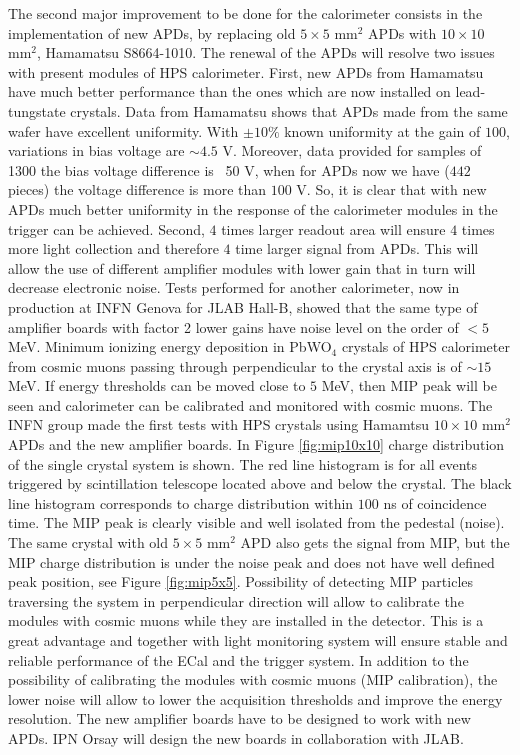 The second major improvement to be done for the calorimeter consists in the implementation of new APDs, by replacing old $5\times 5$ mm$^2$ APDs with $10\times 10$ mm$^2$, Hamamatsu S8664-1010. The renewal of the APDs will resolve two issues with present modules of HPS calorimeter. First, new APDs from Hamamatsu have much better performance than the ones which are now installed on lead-tungstate crystals. Data from Hamamatsu shows that APDs made from the same wafer have excellent uniformity. With $\pm 10\%$ known uniformity at the gain of $100$, variations in bias voltage are $\sim 4.5$ V. Moreover, data provided for samples of 1300 the bias voltage difference is ~50 V, when for APDs now we have ($442$ pieces) the voltage difference is more than $100$ V. So, it is clear that with new APDs much better uniformity in the response of the calorimeter modules in the trigger can be achieved. Second, $4$ times larger readout area will ensure $4$ times more light collection and therefore $4$ time larger signal from APDs. This will allow the use of different amplifier modules with lower gain that in turn will decrease electronic noise. Tests performed for another calorimeter, now in production at INFN Genova for JLAB Hall-B, showed that the same type of amplifier boards with factor 2 lower gains have noise level on the order of $<5$ MeV. Minimum ionizing energy deposition in PbWO$_4$ crystals of HPS calorimeter from cosmic muons passing through perpendicular to the crystal axis is of $\sim 15$ MeV. If energy thresholds can be moved close to $5$ MeV, then MIP peak will be seen and calorimeter can be calibrated and monitored with cosmic muons. The INFN group made the first tests with HPS crystals using Hamamtsu $10\times 10$ mm$^2$ APDs and the new amplifier boards. In Figure \ref{fig:mip10x10} charge distribution of the single crystal system is shown. The red line histogram is for all events triggered by scintillation telescope located above and below the crystal. The black line histogram corresponds to charge distribution within $100$ ns of coincidence time. The MIP peak is clearly visible and well isolated from the pedestal (noise). The same crystal with old $5\times 5$ mm$^2$ APD also gets the signal from MIP, but the MIP charge distribution is under the noise peak and does not have well defined peak position, see Figure \ref{fig:mip5x5}. Possibility of detecting MIP particles traversing the system in perpendicular direction will allow to calibrate the modules with cosmic muons while they are installed in the detector. This is a great advantage and together with light monitoring system will ensure stable and reliable performance of the ECal and the trigger system. In addition to the possibility of calibrating the modules with cosmic muons (MIP calibration), the lower noise will allow to lower the acquisition thresholds and improve the energy resolution. The new amplifier boards have to be designed to work with new APDs. IPN Orsay will design the new boards in collaboration with JLAB. 

